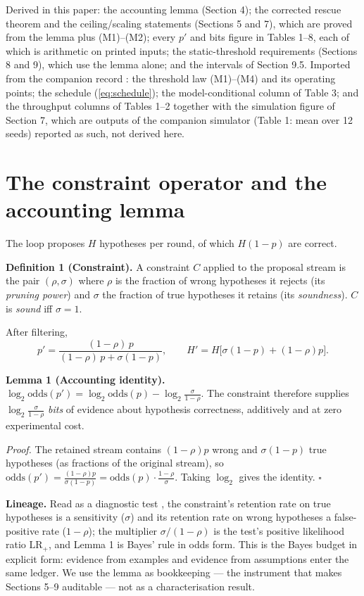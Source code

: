 \documentclass[11pt]{article}
\begin{document}
Derived in this paper: the accounting lemma (Section 4); the corrected
rescue theorem and the ceiling/scaling statements (Sections 5 and 7), which
are proved from the lemma plus (M1)--(M2); every $p'$ and bits figure in
Tables 1--8, each of which is arithmetic on printed inputs; the
static-threshold requirements (Sections 8 and 9), which use the lemma
alone; and the intervals of Section 9.5. Imported from the companion record
\cite{ghosh-throughput}: the threshold law (M1)--(M4) and its operating
points; the schedule (\ref{eq:schedule}); the model-conditional column of
Table 3; and the throughput columns of Tables 1--2 together with the
simulation figure of Section 7, which are outputs of the companion
simulator (Table 1: mean over 12 seeds) reported as such, not derived here.

\section{The constraint operator and the accounting lemma}

The loop proposes $H$ hypotheses per round, of which $H(1-p)$ are correct.

\medskip
\noindent\textbf{Definition 1 (Constraint).} A constraint $C$ applied to the
proposal stream is the pair $(\rho, \sigma)$ where $\rho$ is the fraction of
wrong hypotheses it rejects (its \emph{pruning power}) and $\sigma$ the
fraction of true hypotheses it retains (its \emph{soundness}). $C$ is
\emph{sound} iff $\sigma = 1$.

After filtering,
\begin{equation}
p' = \frac{(1-\rho)\,p}{(1-\rho)\,p + \sigma(1-p)}, \qquad
H' = H\big[\sigma(1-p) + (1-\rho)p\big].
\end{equation}

\medskip
\noindent\textbf{Lemma 1 (Accounting identity).}
$\log_2 \mathrm{odds}(p') = \log_2 \mathrm{odds}(p) -
\log_2 \frac{\sigma}{1-\rho}$. The constraint therefore supplies
$\log_2 \frac{\sigma}{1-\rho}$ \emph{bits} of evidence about hypothesis
correctness, additively and at zero experimental cost.

\medskip
\noindent\emph{Proof.} The retained stream contains $(1-\rho)p$ wrong and
$\sigma(1-p)$ true hypotheses (as fractions of the original stream), so
$\mathrm{odds}(p') = \frac{(1-\rho)p}{\sigma(1-p)} =
\mathrm{odds}(p)\cdot\frac{1-\rho}{\sigma}$. Taking $\log_2$ gives the
identity. \hfill$\square$

\medskip
\noindent\textbf{Lineage.} Read as a diagnostic test \cite{deeks}, the
constraint's retention rate on true hypotheses is a sensitivity ($\sigma$)
and its retention rate on wrong hypotheses a false-positive rate ($1-\rho$);
the multiplier $\sigma/(1-\rho)$ is the test's positive likelihood ratio
$\mathrm{LR}_+$, and Lemma 1 is Bayes' rule in odds form. This is the Bayes
budget in explicit form: evidence from examples and evidence from
assumptions enter the same ledger. We use the lemma as bookkeeping --- the
instrument that makes Sections 5--9 auditable --- not as a characterisation
result.
\end{document}
